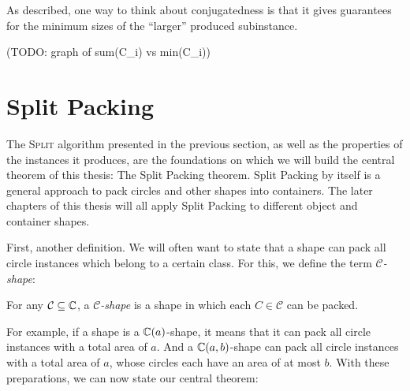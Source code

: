 \documentclass[a4paper,style=print,bibliography=totoc,nexus,lnum,extramargin]{tubsbook}
\begin{document}
As described, one way to think about conjugatedness is that it gives guarantees for the minimum sizes of the “larger” produced subinstance.

(TODO: graph of sum(C_i) vs min(C_i))



\section{Split Packing}

The \textsc{Split} algorithm presented in the previous section, as well as the properties of the instances it produces, are the foundations on which we will build the central theorem of this thesis: The Split Packing theorem. Split Packing by itself is a general approach to pack circles and other shapes into containers. The later chapters of this thesis will all apply Split Packing to different object and container shapes.

First, another definition. We will often want to state that a shape can pack all circle instances which belong to a certain class. For this, we define the term \emph{$\mathcal{C}$-shape}:

\begin{definition}
    For any $\mathcal{C} \subseteq \mathbb{C}$, a \emph{$\mathcal{C}$-shape} is a shape in which each $C \in \mathcal{C}$ can be packed.
\end{definition}

For example, if a shape is a $\mathbb{C}(a)$-shape, it means that it can pack all circle instances with a total area of $a$. And a $\mathbb{C}(a,b)$-shape can pack all circle instances with a total area of $a$, whose circles each have an area of at most $b$.
With these preparations, we can now state our central theorem:
\end{document}
